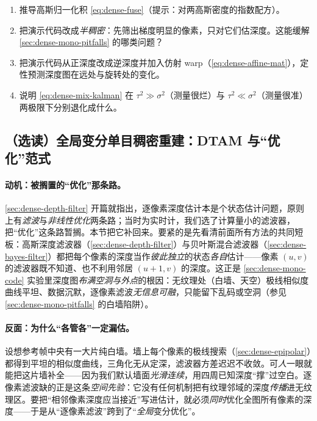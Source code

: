 \begin{practice}[练习]
\begin{enumerate}
  \item 推导高斯归一化积 \cref{eq:dense-fuse}（提示：对两高斯密度的指数配方）。
  \item 把演示代码改成\emph{半稠密}：先筛出梯度明显的像素，只对它们估深度。这能缓解 \cref{sec:dense-mono-pitfalls} 的哪类问题？
  \item 把演示代码从正深度改成逆深度并加入仿射 warp（\cref{eq:dense-affine-mat}），定性预测深度图在远处与旋转处的变化。
  \item 说明 \cref{eq:dense-mix-kalman} 在 $\tau^2\gg\sigma^2$（测量很烂）与 $\tau^2\ll\sigma^2$（测量很准）两极限下分别退化成什么。
\end{enumerate}
\end{practice}

\subsection{（选读）全局变分单目稠密重建：DTAM 与“优化”范式}
\label{sec:dense-dtam}

\paragraph{动机：被搁置的“优化”那条路。}
\cref{sec:dense-depth-filter} 开篇就指出，逐像素深度估计本是个状态估计问题，原则上有\emph{滤波}与\emph{非线性优化}两条路；当时为实时计，我们选了计算量小的滤波器，把“优化”这条路暂搁。本节把它补回来。要紧的是先看清前面所有方法的共同短板：高斯深度滤波器（\cref{sec:dense-depth-filter}）与贝叶斯混合滤波器（\cref{sec:dense-bayes-filter}）都把每个像素的深度当作\emph{彼此独立}的状态\emph{各自}估计——像素 $(u,v)$ 的滤波器既不知道、也不利用邻居 $(u\!+\!1,v)$ 的深度。这正是 \cref{sec:dense-mono-code} 实验里深度图\emph{布满空洞与外点}的根因：无纹理处（白墙、天空）极线相似度曲线平坦、数据沉默，逐像素滤波\emph{无信息可融}，只能留下乱码或空洞（参见 \cref{sec:dense-mono-pitfalls} 的白墙陷阱）。

\paragraph{反面：为什么“各管各”一定漏估。}
设想参考帧中央有一大片纯白墙。墙上每个像素的极线搜索（\cref{sec:dense-epipolar}）都得到平坦的相似度曲线，三角化无从定深，滤波器方差迟迟不收敛。可\emph{人}一眼就能把这片墙补全——因为我们默认墙面\emph{光滑连续}，用四周已知深度“撑”过空白。逐像素滤波缺的正是这条\emph{空间先验}：它没有任何机制把有纹理邻域的深度\emph{传播}进无纹理区。要把“相邻像素深度应当接近”写进估计，就必须\emph{同时}优化全图所有像素的深度——于是从“逐像素滤波”跨到了“\emph{全局}变分优化”。

